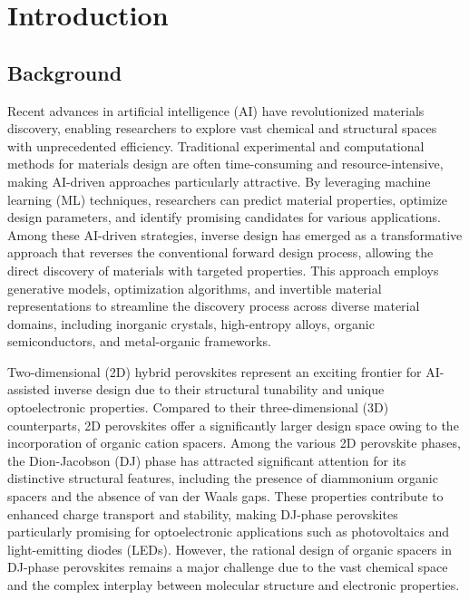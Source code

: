 \chapter{Introduction}\label{c:introduction}

\section{Background}
Recent advances in artificial intelligence (AI) have revolutionized materials discovery, enabling researchers to explore vast chemical and structural spaces with unprecedented efficiency. Traditional experimental and computational methods for materials design are often time-consuming and resource-intensive, making AI-driven approaches particularly attractive. By leveraging machine learning (ML) techniques, researchers can predict material properties, optimize design parameters, and identify promising candidates for various applications\cite{RN421}. Among these AI-driven strategies, inverse design has emerged as a transformative approach that reverses the conventional forward design process, allowing the direct discovery of materials with targeted properties\cite{RN361}. This approach employs generative models, optimization algorithms, and invertible material representations to streamline the discovery process across diverse material domains, including inorganic crystals, high-entropy alloys, organic semiconductors, and metal-organic frameworks\cite{RN412,RN354,RN612}.

Two-dimensional (2D) hybrid perovskites represent an exciting frontier for AI-assisted inverse design due to their structural tunability and unique optoelectronic properties. Compared to their three-dimensional (3D) counterparts, 2D perovskites offer a significantly larger design space owing to the incorporation of organic cation spacers. Among the various 2D perovskite phases, the Dion-Jacobson (DJ) phase has attracted significant attention for its distinctive structural features, including the presence of diammonium organic spacers and the absence of van der Waals gaps. These properties contribute to enhanced charge transport and stability, making DJ-phase perovskites particularly promising for optoelectronic applications such as photovoltaics and light-emitting diodes (LEDs). However, the rational design of organic spacers in DJ-phase perovskites remains a major challenge due to the vast chemical space and the complex interplay between molecular structure and electronic properties\cite{RN144}.

